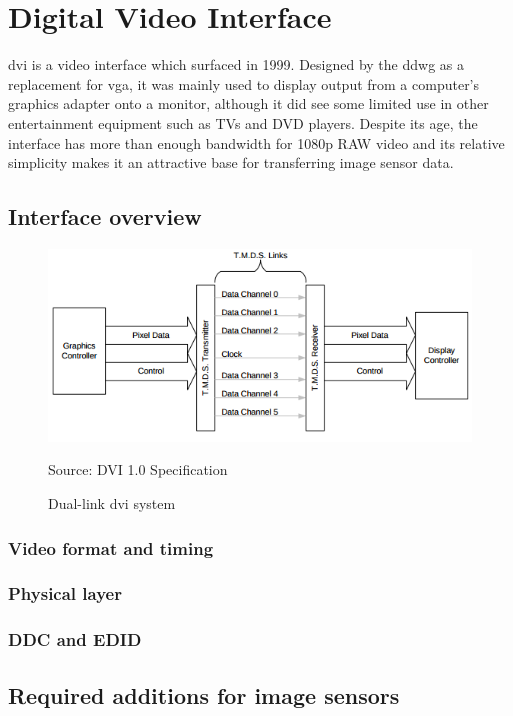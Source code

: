 \chapter{Digital Video Interface}
\gls{dvi} is a video interface which surfaced in 1999. Designed by the \gls{ddwg} as a replacement for \gls{vga}, it was mainly used to display output from a computer's graphics adapter onto a monitor, although it did see some limited use in other entertainment equipment such as TVs and DVD players. Despite its age, the interface has more than enough bandwidth for 1080p RAW video and its relative simplicity makes it an attractive base for transferring image sensor data.

\section{Interface overview}

\begin{figure}
  \centering
  \includegraphics[width=1\textwidth]{./img/dvi_link_overview.png}\par
Source: DVI 1.0 Specification
  \caption{Dual-link \gls{dvi} system}
  \label{fig:dvi_link_overview}
\end{figure}

\subsection{Video format and timing}
\subsection{Physical layer}
\subsection{DDC and EDID}

\section{Required additions for image sensors}